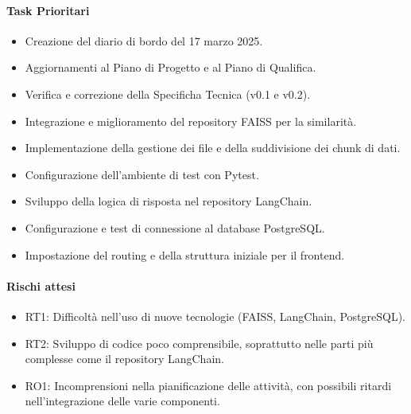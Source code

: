 \documentclass{article}
\begin{document}
            \paragraph{Task Prioritari}
            \begin{itemize}
                \item Creazione del diario di bordo del 17 marzo 2025.
                \item Aggiornamenti al Piano di Progetto e al Piano di Qualifica.
                \item Verifica e correzione della Specificha Tecnica (v0.1 e v0.2).
                \item Integrazione e miglioramento del repository FAISS per la similarità.
                \item Implementazione della gestione dei file e della suddivisione dei chunk di dati.
                \item Configurazione dell’ambiente di test con Pytest.
                \item Sviluppo della logica di risposta nel repository LangChain.
                \item Configurazione e test di connessione al database PostgreSQL.
                \item Impostazione del routing e della struttura iniziale per il frontend.
            \end{itemize}
            
            \paragraph{Rischi attesi}
            \begin{itemize}
                \item RT1: Difficoltà nell’uso di nuove tecnologie (FAISS, LangChain, PostgreSQL).
                \item RT2: Sviluppo di codice poco comprensibile, soprattutto nelle parti più complesse come il repository LangChain.
                \item RO1: Incomprensioni nella pianificazione delle attività, con possibili ritardi nell’integrazione delle varie componenti.
            \end{itemize}
\end{document}
